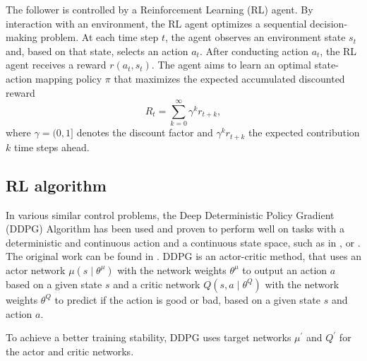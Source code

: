 \documentclass[review]{elsarticle}
\providecommand{\martinc}[1]{}                  %
\providecommand{\3}{{\ss}}
\begin{document}
	The follower is controlled by a Reinforcement
	Learning (RL) agent. By interaction with an environment, the RL agent
	optimizes a sequential decision-making problem. At each time step
	$t$, the agent observes an environment state $s_t$ and, based on that state, selects
	an action $a_t$. After conducting action $a_t$, the RL agent receives
	a reward $r(a_t,s_t)$. The agent aims to learn an optimal state-action
	mapping policy $\pi$ that maximizes the expected accumulated
	discounted reward
	\begin{equation}
	\label{Rt}
	R_{t}=\sum_{k=0}^{\infty} \gamma^{k} r_{t+k},
	\end{equation}
	where $\gamma = (0,1]$ denotes the discount factor and 
	$\gamma^k r_{t+k}$ the expected contribution $k$ time steps ahead. 
	\subsection{\label{RL-algorithm}RL algorithm}
	In various similar control problems, the Deep Deterministic Policy
	Gradient (DDPG) Algorithm has been used and proven to perform well on
	tasks with a deterministic and continuous action and a
	continuous state space, such as in
	\cite{SafeEfficientAndComfortable}, \cite{ComparisonRLvsMPC} or
	\cite{HumanLikeAutonomouCF}. The original work can be found in
	\cite{DDPG}. DDPG is an actor-critic method, that uses an actor network
	$\mu\left(s \mid \theta^{\mu}\right)$ with the network weights $\theta^{\mu} $
	to output an action $a$ based on a given state $s$ and a critic network
	$Q\left(s, a \mid \theta^{Q}\right) $ with the network weights  $\theta^{Q}$ to
	predict if the action is good or bad, based on a given state $s$ and
	action $a$. \martinc{Ich w\"urde Subskripte f\"ur die Parameter(vektoren?)
		$\theta_{\mu}$ und $\theta_Q$ nehmen. Oder sind die Superskripte
		Konvention hier?}
	\martinc{Ferner ist mir nicht klar, wie sich die
		Einleitung (Parameter des Aktions-Algorithmus bzw  Policy $\pi$ so w\"ahlen, dass der reward $R_t$
		maximiert wird) von der
		Actor-Critic Darstellung unterscheiden. F\"ur mich ist der Actor
		$\mu|\theta$ einfach der Algorithmus $\pi|\theta$ und die Critic die
		Rewardfunktion $R_t$, die als kumulierter Reward eigentlich keine im Lernprozess
		ver\"anderbaren Parameter hat, also alter Wein in neuen
		Schl\"auchen: Der Unterschied zu bzw. die Pr\"azisierung der
		Einleitung sollte klar werden, Au\3erdem, dass $\theta$ wohl den
		Vektor der Synapsenst\"arken/Linkst\"arken des jeweiligen NN angibt.)} 
	To achieve a better training stability, DDPG uses target networks  $\mu^{\prime}$ and $Q^{\prime}$ for the actor and critic networks.
\end{document}
